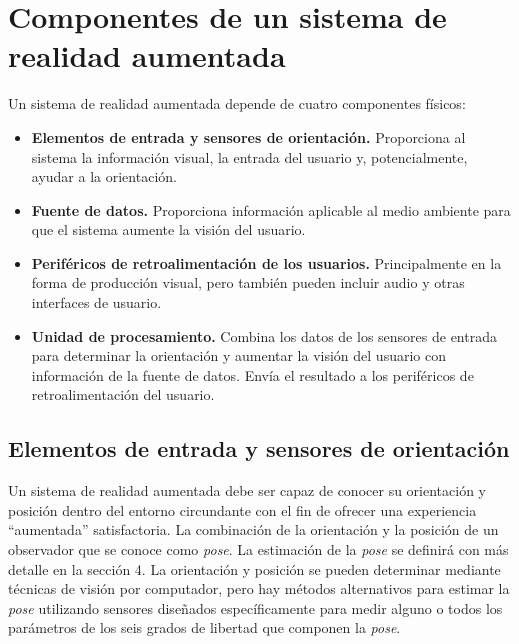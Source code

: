 
\section{Componentes de un sistema de realidad aumentada}
Un sistema de realidad aumentada depende de cuatro componentes físicos:

\begin{itemize}

\item \textbf{Elementos de entrada y sensores de orientación.} Proporciona al sistema la información visual, la entrada del usuario y, potencialmente, ayudar a la orientación.

\item \textbf{Fuente de datos.} Proporciona información aplicable al medio ambiente para que el sistema aumente la visión del usuario.

\item \textbf{Periféricos de retroalimentación de los usuarios.} Principalmente en la forma de producción visual, pero también pueden incluir audio y otras interfaces de usuario.

\item \textbf{Unidad de procesamiento.} Combina los datos de los sensores de entrada para determinar la orientación y aumentar la visión del usuario con información de la fuente de datos. Envía el resultado a los periféricos de retroalimentación del usuario.

\end{itemize}

\subsection{Elementos de entrada y sensores de orientación}
Un sistema de realidad aumentada debe ser capaz de conocer su orientación y posición dentro del entorno circundante con el fin de ofrecer una experiencia ``aumentada'' satisfactoria. La combinación de la orientación y la posición de un observador que se conoce como \emph{pose}. La estimación de la \emph{pose} se definirá con más detalle en la sección 4. La orientación y posición se pueden determinar mediante técnicas de visión por computador, pero hay métodos alternativos para estimar la \emph{pose}  utilizando  sensores diseñados específicamente para medir alguno o todos los parámetros de los seis grados de libertad que componen la \emph{pose}.

